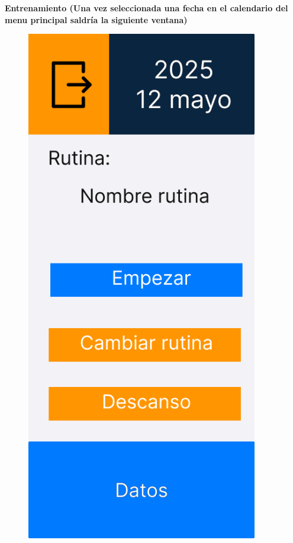 \newpage

\textbf{Entrenamiento (Una vez seleccionada una fecha en el calendario del menu principal saldría la siguiente ventana)}

\begin{figure}[H]
   \centering
   \begin{minipage}{0.45\textwidth}
      \centering
      \includegraphics[width=0.9\textwidth]{fotos/Frame 26.png}

\end{minipage}
\end{figure}
